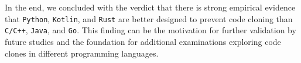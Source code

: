 In the end, we concluded with the verdict that there is strong empirical evidence that \texttt{Python}, \texttt{Kotlin}, and \texttt{Rust} are better designed to prevent code cloning than \texttt{C/C++}, \texttt{Java}, and \texttt{Go}. This finding can be the motivation for further validation by future studies and the foundation for additional examinations exploring code clones in different programming languages. 